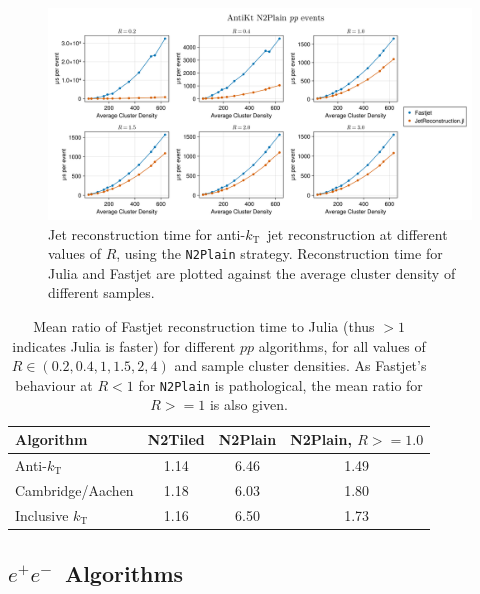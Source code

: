 \documentclass{webofc}
\newcommand{\kt}{${k}_\text{T}$}
\newcommand{\akt}{anti-${k}_\text{T}$}
\newcommand{\Akt}{Anti-${k}_\text{T}$}
\newcommand{\ee}{$e^+e^-$}
\begin{document}
\begin{figure}[ht]
    \begin{center}
        \includegraphics[width=0.8\linewidth]{Alma9-AMD-Ryzen7-Julia-Fastjet-AntiKt-N2Plain-MultiR.png}
        \caption{Jet reconstruction time for \akt\ jet reconstruction at different values of $R$, using the \texttt{N2Plain} strategy. Reconstruction time for Julia and Fastjet are plotted against the average cluster density of different samples.}
        \label{fig:antiktPlainResults}
    \end{center}
\end{figure}

\begin{table}[ht]
    \begin{center}
        \begin{tabular}{l|ccc}
            \textbf{Algorithm} & \textbf{N2Tiled} & \textbf{N2Plain} & \textbf{N2Plain}, $R>=1.0$ \\
            \hline
            \Akt & 1.14 & 6.46 & 1.49 \\
            Cambridge/Aachen & 1.18 & 6.03 & 1.80 \\
            Inclusive \kt & 1.16 & 6.50 & 1.73 \\
        \end{tabular}
        \caption{Mean ratio of Fastjet reconstruction time to Julia (thus $>1$ indicates Julia is faster) for different $pp$ algorithms, for all values of $R \in (0.2, 0.4, 1, 1.5, 2, 4)$ and sample cluster densities. As Fastjet's behaviour at $R<1$ for \texttt{N2Plain} is pathological, the mean ratio for $R>=1$ is also given.}
        \label{tab:ppratios}
    \end{center}
\end{table}

\subsection{\ee\ Algorithms}
\end{document}
